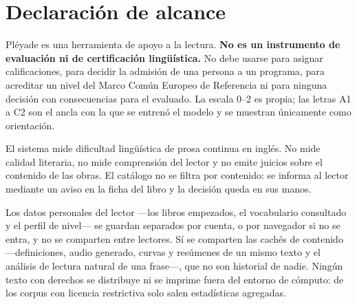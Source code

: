 \documentclass[11pt,a4paper]{article}
\begin{document}
\section*{Declaración de alcance}

Pléyade es una herramienta de apoyo a la lectura. \textbf{No es un instrumento de
evaluación ni de certificación lingüística.} No debe usarse para asignar calificaciones,
para decidir la admisión de una persona a un programa, para acreditar un nivel del Marco
Común Europeo de Referencia ni para ninguna decisión con consecuencias para el evaluado.
La escala 0--2 es propia; las letras A1 a C2 son el ancla con la que se entrenó el modelo
y se muestran únicamente como orientación.

El sistema mide dificultad lingüística de prosa continua en inglés. No mide calidad
literaria, no mide comprensión del lector y no emite juicios sobre el contenido de las
obras. El catálogo no se filtra por contenido: se informa al lector mediante un aviso en
la ficha del libro y la decisión queda en sus manos.

Los datos personales del lector —los libros empezados, el vocabulario consultado y el
perfil de nivel— se guardan separados por cuenta, o por navegador si no se entra, y no se
comparten entre lectores. Sí
se comparten las cachés de contenido ---definiciones, audio generado, curvas y resúmenes de
un mismo texto y el análisis de lectura natural de una frase---, que no son historial de
nadie. Ningún texto con derechos se distribuye ni se imprime fuera del entorno de cómputo:
de los corpus con licencia restrictiva solo salen estadísticas agregadas.

\clearpage
\printbibliography[title={Referencias}]
\end{document}
